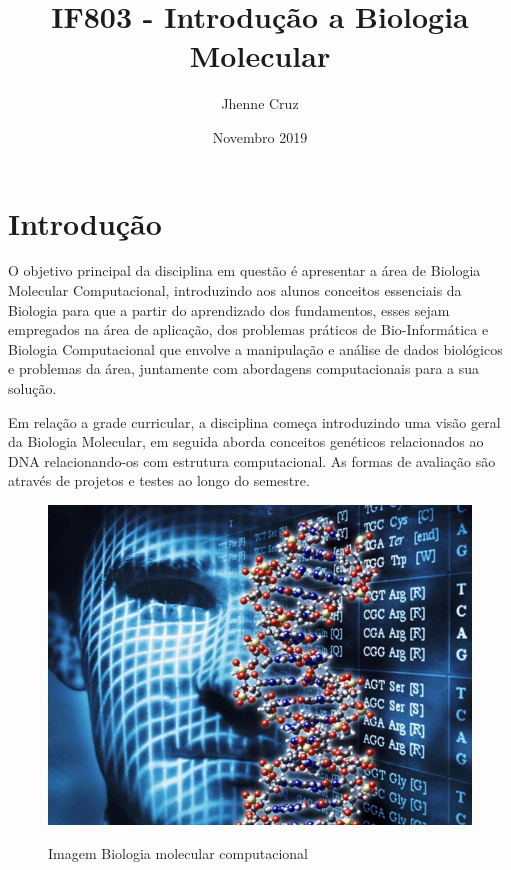 \documentclass[10pt]{article}
\title{IF803 - Introdução a Biologia Molecular}
\author{Jhenne Cruz}
\date{Novembro 2019}
\begin{document}
\maketitle

\section{Introdução}

\qquad O objetivo principal da disciplina em questão é apresentar a área de Biologia Molecular Computacional, introduzindo aos alunos conceitos essenciais da Biologia para que a partir do aprendizado dos fundamentos, esses sejam empregados na área de aplicação, dos problemas práticos de Bio-Informática e Biologia Computacional que envolve a manipulação e análise de dados biológicos e problemas da área, juntamente com abordagens computacionais para a sua solução.\citep{intro}

Em relação a grade curricular, a disciplina começa introduzindo uma visão geral da Biologia Molecular, em seguida aborda conceitos genéticos relacionados ao DNA relacionando-os com estrutura computacional. As formas de avaliação são através de projetos e testes ao longo do semestre.\cite{intro}


\begin{figure}[h!]
\centering
\includegraphics[scale=0.25]{imagem.jpg}
\caption{Imagem Biologia molecular computacional}\cite{imagem}
\label{fig:imagem}
\end{figure}
\end{document}
